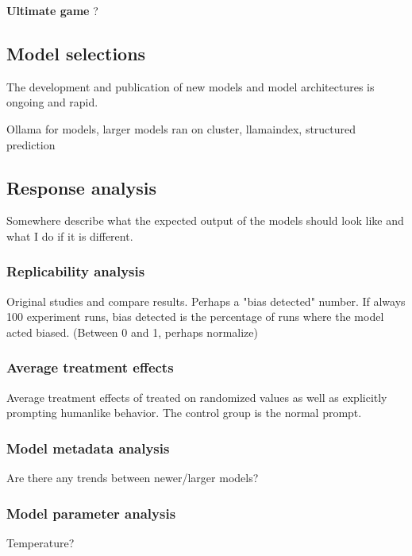 \par \textbf{Ultimate game} ?


\subsection{Model selections}
\par The development and publication of new models and model architectures is ongoing and rapid. 

Ollama for models, larger models ran on cluster, llamaindex, structured prediction


\subsection{Response analysis}
Somewhere describe what the expected output of the models should look like and what I do if it is different.

\subsubsection{Replicability analysis}
Original studies and compare results. Perhaps a "bias detected" number. If always 100 experiment runs, bias detected is the percentage of runs where the model acted biased. (Between 0 and 1, perhaps normalize)

\subsubsection{Average treatment effects}
Average treatment effects of treated on randomized values as well as explicitly prompting humanlike behavior. The control group is the normal prompt.

\subsubsection{Model metadata analysis}
Are there any trends between newer/larger models?

\subsubsection{Model parameter analysis}
Temperature?